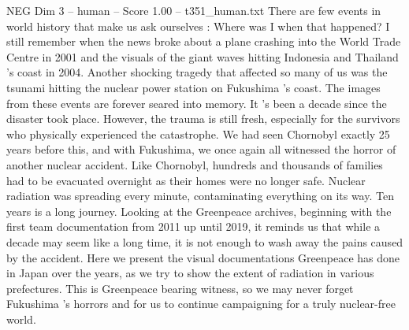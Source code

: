 \begin{textsample}{NEG Dim 3 – human – Score 1.00 – t351\_human.txt}  \label{ex:f3_neg_050}
There are few events in world history that make us ask ourselves : Where was I when that happened?
I still remember when the news broke about a plane crashing into the World Trade Centre in 2001 and the visuals of the giant waves hitting Indonesia and Thailand ’s coast in 2004.
Another shocking tragedy that affected so many of us was the tsunami hitting the nuclear power station on Fukushima ’s coast.
The images from these events are forever seared into memory.
It ’s been a decade since the disaster took place.
However, the trauma is still fresh, especially for the survivors who physically experienced the catastrophe.
We had seen Chornobyl exactly 25 years before this, and with Fukushima, we once again all witnessed the horror of another ​nuclear ​accident​. ​Like Chornobyl, hundreds and thousands of families had to be evacuated overnight as their homes were no longer safe.
Nuclear radiation was spreading every minute, contaminating everything on its way.
Ten years is a long journey.
Looking at the Greenpeace archives, beginning with the first team documentation from 2011 up until 2019, it reminds us that while a decade may seem like a long time, it is not enough to wash away the pains caused by the accident.
Here we present the visual documentations Greenpeace has done in Japan over the years, as we try to show the extent of radiation in various prefectures.
This is Greenpeace bearing witness, so we may never forget Fukushima ’s horrors and for us to continue campaigning for a truly nuclear-free world.

\end{textsample}
